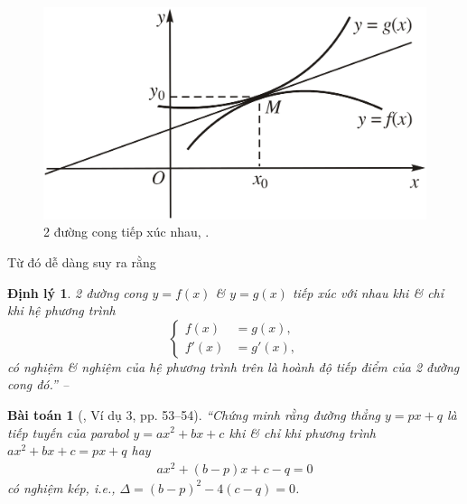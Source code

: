 \documentclass[oneside]{book}
\numberwithin{equation}{section}
\newtheorem{baitoan}{Bài toán}[section]
\newtheorem{dinhly}{Định lý}[section]
\begin{document}
\begin{figure}[H]
	\centering
	\includegraphics[scale=0.15]{2_duong_cong_tiep_xuc}
	\caption{2 đường cong tiếp xúc nhau, \cite[Hình 1.20, p. 52]{SGK_Toan_12_giai_tich_nang_cao}.}
	\label{fig:2_duong_cong_tiep_xuc}
\end{figure}
Từ đó dễ dàng suy ra rằng

\begin{dinhly}
	2 đường cong $y = f(x)$ \& $y = g(x)$ tiếp xúc với nhau khi \& chỉ khi hệ phương trình
	\begin{equation*}
		\left\{\begin{split}
			f(x) &= g(x),\\
			f'(x) &= g'(x),
		\end{split}\right.
	\end{equation*}
	có nghiệm \& nghiệm của hệ phương trình trên là hoành độ tiếp điểm của 2 đường cong đó.'' -- \cite[p. 52]{SGK_Toan_12_giai_tich_nang_cao}
\end{dinhly}

\begin{baitoan}[\cite{SGK_Toan_12_giai_tich_nang_cao}, Ví dụ 3, pp. 53--54]
	``Chứng minh rằng đường thẳng $y = px + q$ là tiếp tuyến của parabol $y = ax^2 + bx + c$ khi \& chỉ khi phương trình $ax^2 + bx + c = px + q$ hay
	\begin{align}
		\label{SGK_Toan_12_giai_tich_nang_cao (3) p. 54}
		ax^2 + (b - p)x + c - q = 0
	\end{align}
	có nghiệm kép, i.e., $\Delta = (b - p)^2 - 4(c - q) = 0$.
\end{baitoan}
\end{document}
